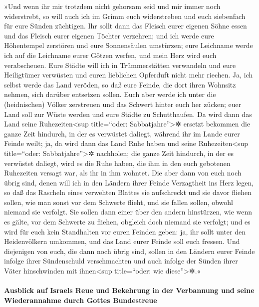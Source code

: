 »Und wenn ihr mir trotzdem nicht gehorsam seid und mir
immer noch widerstrebt, so will auch ich im Grimm euch
widerstreben und euch siebenfach für eure Sünden züchtigen.
Ihr sollt dann das Fleisch eurer eigenen Söhne essen und
das Fleisch eurer eigenen Töchter verzehren; und ich
werde eure Höhentempel zerstören und eure Sonnensäulen umstürzen; eure
Leichname werde ich auf die Leichname eurer Götzen werfen, und mein Herz
wird euch verabscheuen. Eure Städte will ich in
Trümmerstätten verwandeln und eure Heiligtümer verwüsten und euren
lieblichen Opferduft nicht mehr riechen. Ja, ich selbst
werde das Land veröden, so daß eure Feinde, die dort ihren Wohnsitz
nehmen, sich darüber entsetzen sollen. Euch aber werde
ich unter die (heidnischen) Völker zerstreuen und das Schwert hinter
euch her zücken; euer Land soll zur Wüste werden und eure Städte zu
Schutthaufen. Da wird dann das Land seine
Ruhezeiten\textless sup title=``oder: Sabbatjahre''\textgreater✲ ersetzt
bekommen die ganze Zeit hindurch, in der es verwüstet daliegt, während
ihr im Lande eurer Feinde weilt; ja, da wird dann das Land Ruhe haben
und seine Ruhezeiten\textless sup title=``oder:
Sabbatjahre''\textgreater✲ nachholen; die ganze Zeit
hindurch, in der es verwüstet daliegt, wird es die Ruhe haben, die ihm
in den euch gebotenen Ruhezeiten versagt war, als ihr in ihm wohntet.
Die aber dann von euch noch übrig sind, denen will ich in
den Ländern ihrer Feinde Verzagtheit ins Herz legen, so daß das Rascheln
eines verwehten Blattes sie aufschreckt und sie davor fliehen sollen,
wie man sonst vor dem Schwerte flieht, und sie fallen sollen, obwohl
niemand sie verfolgt. Sie sollen dann einer über den
andern hinstürzen, wie wenn es gälte, vor dem Schwerte zu fliehen,
obgleich doch niemand sie verfolgt; und es wird für euch kein
Standhalten vor euren Feinden geben: ja, ihr sollt unter
den Heidenvölkern umkommen, und das Land eurer Feinde soll euch fressen.
Und diejenigen von euch, die dann noch übrig sind, sollen
in den Ländern eurer Feinde infolge ihrer Sündenschuld verschmachten und
auch infolge der Sünden ihrer Väter hinschwinden mit ihnen\textless sup
title=``oder: wie diese''\textgreater✲.«

\hypertarget{ausblick-auf-israels-reue-und-bekehrung-in-der-verbannung-und-seine-wiederannahme-durch-gottes-bundestreue}{%
\paragraph{Ausblick auf Israels Reue und Bekehrung in der Verbannung und
seine Wiederannahme durch Gottes
Bundestreue}\label{ausblick-auf-israels-reue-und-bekehrung-in-der-verbannung-und-seine-wiederannahme-durch-gottes-bundestreue}}

